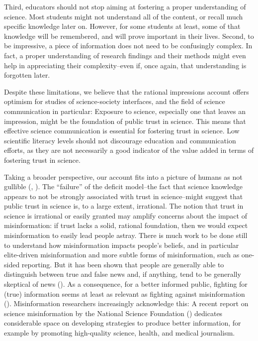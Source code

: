 \documentclass[
  jou,
  floatsintext,
  longtable,
  nolmodern,
  notxfonts,
  notimes,
  colorlinks=true,linkcolor=blue,citecolor=blue,urlcolor=blue]{apa7}
\begin{document}
Third, educators should not stop aiming at fostering a proper
understanding of science. Most students might not understand all of the
content, or recall much specific knowledge later on. However, for some
students at least, some of that knowledge will be remembered, and will
prove important in their lives. Second, to be impressive, a piece of
information does not need to be confusingly complex. In fact, a proper
understanding of research findings and their methods might even help in
appreciating their complexity--even if, once again, that understanding
is forgotten later.

Despite these limitations, we believe that the rational impressions
account offers optimism for studies of science-society interfaces, and
the field of science communication in particular: Exposure to science,
especially one that leaves an impression, might be the foundation of
public trust in science. This means that effective science communication
is essential for fostering trust in science. Low scientific literacy
levels should not discourage education and communication efforts, as
they are not necessarily a good indicator of the value added in terms of
fostering trust in science.

Taking a broader perspective, our account fits into a picture of humans
as not gullible (, ). The
``failure'' of the deficit model--the fact that science knowledge
appears to not be strongly associated with trust in science--might
suggest that public trust in science is, to a large extent, irrational.
The notion that trust in science is irrational or easily granted may
amplify concerns about the impact of misinformation: if trust lacks a
solid, rational foundation, then we would expect misinformation to
easily lead people astray. There is much work to be done still to
understand how misinformation impacts people's beliefs, and in
particular elite-driven misinformation and more subtle forms of
misinformation, such as one-sided reporting. But it has been shown that
people are generally able to distinguish between true and false news
and, if anything, tend to be generally skeptical of news
().
As a consequence, for a better informed public, fighting for (true)
information seems at least as relevant as fighting against
misinformation (). Misinformation researchers increasingly acknowledge this: A
recent report on science misinformation by the National Science
Foundation
() dedicates considerable space on developing
strategies to produce better information, for example by promoting
high-quality science, health, and medical journalism.
\end{document}
